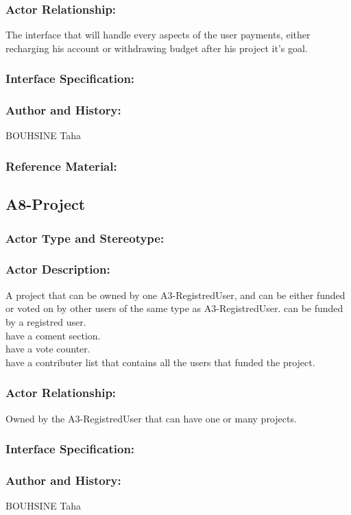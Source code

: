 \documentclass[11pt, openany]{report}
\begin{document}
\subsubsection{Actor Relationship:}
The interface that will handle every aspects of the user payments, either recharging his account or withdrawing budget after his project it's goal.
\subsubsection{Interface Specification:}
\subsubsection{Author and History:}
BOUHSINE Taha
\subsubsection{Reference Material:}

\clearpage
\subsection{A8-Project}
\label{A8}
\subsubsection{Actor Type and Stereotype:}
\subsubsection{Actor Description:}
A project that can be owned by one A3-RegistredUser, and can be either funded or voted on by other users of the same type as A3-RegistredUser.
can be funded by a registred user.\\
have a coment section.\\
have a vote counter.\\
have a contributer list that contains all the users that funded the project.\\

\subsubsection{Actor Relationship:}
Owned by the A3-RegistredUser that can have one or many projects.
\subsubsection{Interface Specification:}
\subsubsection{Author and History:}
BOUHSINE Taha
\end{document}
